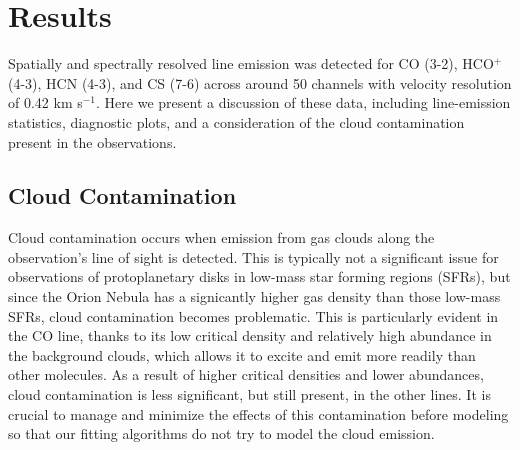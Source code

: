 \chapter{Results}
\label{chap:results}


Spatially and spectrally resolved line emission was detected for CO (3-2), HCO$^{+}$ (4-3), HCN (4-3), and CS (7-6) across around 50 channels with velocity resolution of 0.42 km s$^{-1}$. Here we present a discussion of these data, including line-emission statistics, diagnostic plots, and a consideration of the cloud contamination present in the observations.


\section{Cloud Contamination}
\label{section:cloud_contamination}

Cloud contamination occurs when emission from gas clouds along the observation's line of sight is detected. This is typically not a significant issue for observations of protoplanetary disks in low-mass star forming regions (SFRs), but since the Orion Nebula has a signicantly higher gas density than those low-mass SFRs, cloud contamination becomes problematic. This is particularly evident in the CO line, thanks to its low critical density and relatively high abundance in the background clouds, which allows it to excite and emit more readily than other molecules. As a result of higher critical densities and lower abundances, cloud contamination is less significant, but still present, in the other lines. It is crucial to manage and minimize the effects of this contamination before modeling so that our fitting algorithms do not try to model the cloud emission.




